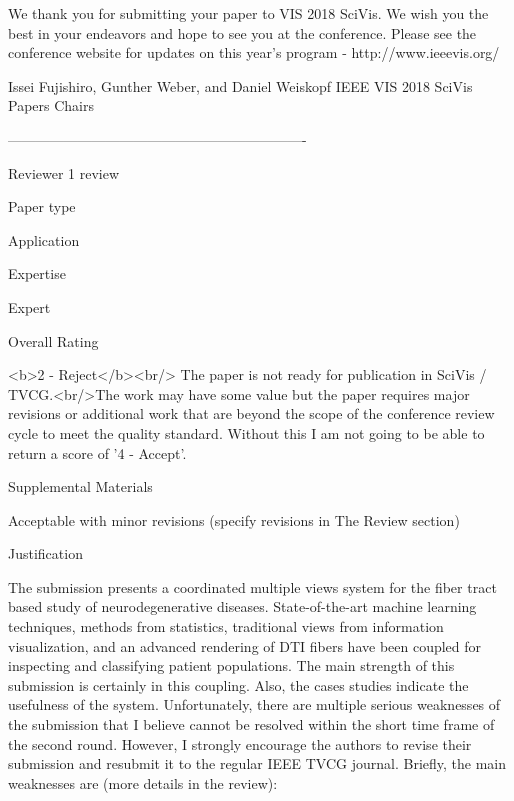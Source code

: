 We thank you for submitting your paper to VIS 2018 SciVis. We wish you the best in your endeavors and hope to see you at the conference. Please see the conference website for updates on this year's program - http://www.ieeevis.org/

Issei Fujishiro, Gunther Weber, and Daniel Weiskopf
IEEE VIS 2018 SciVis Papers Chairs


----------------------------------------------------------------

Reviewer 1 review

  Paper type

    Application

  Expertise

    Expert

  Overall Rating

    <b>2 - Reject</b><br/> The paper is not ready for publication in SciVis /
    TVCG.<br/>The work may have some value but the paper requires major revisions or
    additional work that are beyond the scope of the conference review cycle to meet
    the quality standard. Without this I am not going to be able to return a score of
    '4 - Accept'.

  Supplemental Materials

    Acceptable with minor revisions (specify revisions in The Review section)

  Justification

    The submission presents a coordinated multiple views system for the fiber tract
    based study of neurodegenerative diseases. State-of-the-art machine learning
    techniques, methods from statistics, traditional views from information
    visualization, and an advanced rendering of DTI fibers have been coupled for
    inspecting and classifying patient populations. The main strength of this
    submission is certainly in this coupling. Also, the cases studies indicate the
    usefulness of the system. Unfortunately, there are multiple serious weaknesses of
    the submission that I believe cannot be resolved within the short time frame of
    the second round. However, I strongly encourage the authors to revise their
    submission and resubmit it to the regular IEEE TVCG journal. Briefly, the main
    weaknesses are (more details in the review):

